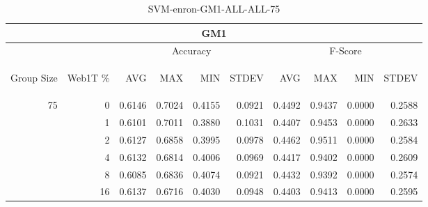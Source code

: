 \begin{center}
\begin{table}[htbp] 
 \begin{center}
\begin{tabular}{ | r | r | r | r | r | r | r | r | r | r |}
\hline
\multicolumn{10}{|c|}{GM1}\\
\hline
 & & \multicolumn{4}{|c|}{Accuracy} & \multicolumn{4}{|c|}{F-Score}\\ \cline{3-10}
\begin{sideways}Group Size\end{sideways} & \begin{sideways}Web1T \%\end{sideways} & \begin{sideways}AVG\end{sideways} & \begin{sideways}MAX\end{sideways} & \begin{sideways}MIN\end{sideways} & \begin{sideways}STDEV\end{sideways} & \begin{sideways}AVG\end{sideways} & \begin{sideways}MAX\end{sideways} & \begin{sideways}MIN\end{sideways} & \begin{sideways}STDEV\end{sideways}\\
\hline
\multirow{5}{*}{75}
 & 0 & 0.6146 & 0.7024 & 0.4155 & 0.0921 & 0.4492 & 0.9437 & 0.0000 & 0.2588\\ \cline{2-10}
 & 1 & 0.6101 & 0.7011 & 0.3880 & 0.1031 & 0.4407 & 0.9453 & 0.0000 & 0.2633\\ \cline{2-10}
 & 2 & 0.6127 & 0.6858 & 0.3995 & 0.0978 & 0.4462 & 0.9511 & 0.0000 & 0.2584\\ \cline{2-10}
 & 4 & 0.6132 & 0.6814 & 0.4006 & 0.0969 & 0.4417 & 0.9402 & 0.0000 & 0.2609\\ \cline{2-10}
 & 8 & 0.6085 & 0.6836 & 0.4074 & 0.0921 & 0.4432 & 0.9392 & 0.0000 & 0.2574\\ \cline{2-10}
 & 16 & 0.6137 & 0.6716 & 0.4030 & 0.0948 & 0.4403 & 0.9413 & 0.0000 & 0.2595\\ \cline{2-10}
\hline
\end{tabular}
\caption{SVM-enron-GM1-ALL-ALL-75}
\label{table:SVM-enron-GM1-ALL-ALL-75}
\end{center}
 \end{table}
\end{center}

